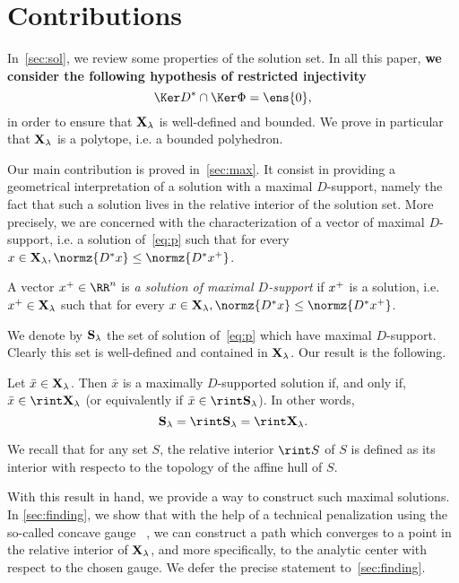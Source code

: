 \section{Contributions}
\label{sec:contrib}

In~\cref{sec:sol}, we review some properties of the solution set.
In all this paper, \textbf{we consider the following hypothesis of restricted injectivity}
\begin{equation}\label{eq:hyp-inv}
  \Ker D^* \cap \Ker \Phi = \ens{0} ,
\end{equation}
in order to ensure that $\mathbf{X}_{\lambda}$ is well-defined and bounded.
We prove in particular that $\mathbf{X}_{\lambda}$ is a polytope, i.e. a bounded polyhedron.

Our main contribution is proved in~\cref{sec:max}.
It consist in providing a geometrical interpretation of a solution with a maximal $D$-support, namely the fact that such a solution lives in the relative interior of the solution set.
More precisely, we are concerned with the characterization of a vector of maximal $D$-support, i.e. a solution of~\eqref{eq:p} such that for every $x \in \Xl, \normz{D^* x} \leq \normz{D^* \maxx}$.
\begin{definition}
  A vector $\maxx \in \RR^n$ is \emph{a solution of maximal $D$-support} if $x^+$ is a solution, i.e. $x^+ \in \mathbf{X}_{\lambda}$ such that for every $x \in \Xl, \normz{D^* x} \leq \normz{D^* \maxx}$.
\end{definition}
We denote by $\mathbf{S}_{\lambda}$ the set of solution of~\eqref{eq:p} which have maximal $D$-support.
Clearly this set is well-defined and contained in $\mathbf{X}_{\lambda}$.
Our result is the following.
\begin{theorem}\label{thm:maximal-characterization}
  Let $\bar{x} \in \mathbf{X}_{\lambda}$. Then $\bar{x}$ is a maximally $D$-supported solution if, and only if, $\bar{x} \in \rint \Xl$ (or equivalently if $\bar{x} \in \rint \Sl$).
  In other words, 
  \begin{equation*}
    \Sl = \rint \Sl = \rint \Xl .
  \end{equation*}
\end{theorem}
We recall that for any set $S$, the relative interior $\rint S$ of $S$ is
defined as its interior with respecto to the topology of the affine hull of $S$.

With this result in hand, we provide a way to construct such maximal solutions.
In \cref{sec:finding}, we show that with the help of a technical penalization using the so-called concave gauge ~\cite{barbara2015strict}, we can construct a path which converges to a point in the relative interior of $\mathbf{X}_{\lambda}$, and more specifically, to the analytic center with respect to the chosen gauge.
We defer the precise statement to~\cref{sec:finding}.